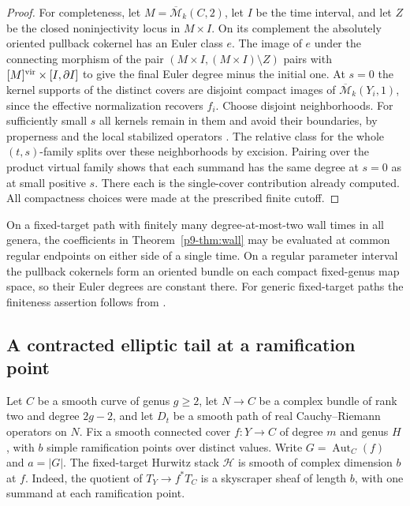 \begin{proof}
For completeness, let $M=\overline{\mathcal M}_{k}(C,2)$, let $I$
be the time interval, and let $Z$ be the closed noninjectivity locus
in $M\times I$. On its complement the absolutely oriented pullback
cokernel has an Euler class $e$. The image of $e$ under the
connecting morphism of the pair $(M\times I,(M\times I)\setminus Z)$
pairs with $[M]^{\rm vir}\times[I,\partial I]$ to give the final
Euler degree minus the initial one. At $s=0$ the kernel supports of
the distinct covers are disjoint compact images of
$\overline{\mathcal M}_k(Y_i,1)$, since the effective normalization
recovers $f_i$. Choose disjoint neighborhoods. For sufficiently small
$s$ all kernels remain in them and avoid their boundaries, by
properness and the local stabilized operators
\cite[Appendix~B, (B.8)]{bai}. The relative class for the whole
$(t,s)$-family splits over these neighborhoods by excision. Pairing
over the product virtual family shows that each summand has the same
degree at $s=0$ as at small positive $s$. There each is the
single-cover contribution already computed. All compactness choices
were made at the prescribed finite cutoff.
\end{proof}

On a fixed-target path with finitely many degree-at-most-two wall
times in all genera, the coefficients in Theorem~\ref{p9-thm:wall} may
be evaluated at common regular endpoints on either side of a single
time. On a regular parameter interval the pullback cokernels form an
oriented bundle on each compact fixed-genus map space, so their
Euler degrees are constant there. For generic fixed-target paths the
finiteness assertion follows from \cite[Definition~2.6,
Proposition~2.7 and Theorem~3.40]{dw}.
\subsection{A contracted elliptic tail at a ramification point}\label{p9-sec:tail}

Let $C$ be a smooth curve of genus $g\geq 2$, let $N\to C$ be a complex
bundle of rank two and degree $2g-2$, and let $D_t$ be a smooth path of
real Cauchy--Riemann operators on $N$. Fix a smooth connected cover
$f:Y\to C$ of degree $m$ and genus $H$, with $b$ simple ramification
points over distinct values. Write $G=\operatorname{Aut}_C(f)$ and
$a=|G|$. The fixed-target Hurwitz stack $\mathcal H$ is smooth of complex
dimension $b$ at $f$. Indeed, the quotient of $T_Y\to f^*T_C$ is a
skyscraper sheaf of length $b$, with one summand at each ramification point.

